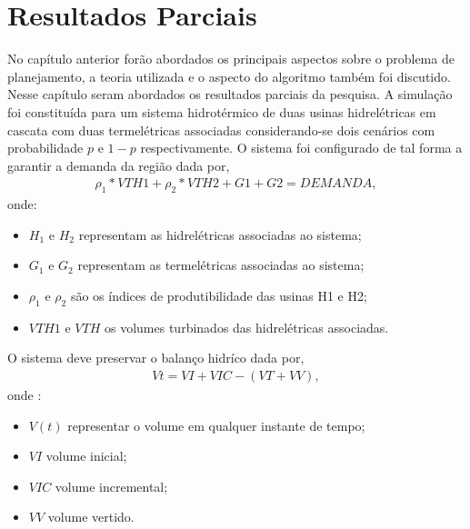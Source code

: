 \graphicspath{ {/home/jefferson/Modelamento/} }
\chapter{Resultados Parciais}
No cap\'itulo anterior for\~ao abordados os principais aspectos sobre o problema de planejamento, a teoria utilizada e o
aspecto do algoritmo tamb\'em foi discutido. Nesse cap\'itulo seram abordados os resultados parciais da pesquisa.
A simula\c c\~ao  foi constitu\'ida para um sistema hidrot\'ermico de duas usinas hidrel\'etricas em cascata
com duas termel\'etricas associadas considerando-se dois cen\'arios com probabilidade $p$ e $1-p$ respectivamente.
O sistema foi configurado de tal forma a garantir a demanda da regi\~ao dada por,
\begin{align*}
  \displaystyle{\rho}_1*VTH1 + {\rho}_2*VTH2 + G1 + G2 = DEMANDA,
\end{align*}
onde:
\begin{itemize}
	\item $H_1$ e $H_2$ representam as hidrel\'etricas associadas ao sistema;
	\item $G_1$ e $G_2$ representam as termel\'etricas associadas ao sistema;
	\item $\rho_1$ e $\rho_2$ s\~ao os \'indices de produtibilidade das usinas H1 e H2;
	\item $VTH1$ e $VTH$  os volumes turbinados das hidrel\'etricas associadas.
\end{itemize}
O sistema deve preservar o balan\c co hidr\'ico dada por,
{\setlength{\belowdisplayskip}{-4pt}
\begin{align*}
  \displaystyle Vt = VI + VIC - \left( VT + VV \right), 
\end{align*}}
onde : 
\begin{itemize}
	\item $V(t)$ representar o volume em qualquer instante de tempo;
	\item $VI$  volume inicial;
	\item $VIC$ volume incremental;
	\item $VV$ volume vertido.
\end{itemize}
